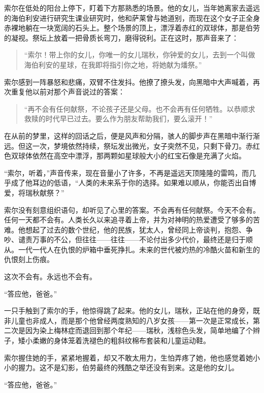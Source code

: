 \documentclass[AutoFakeBold=true]{book}
\begin{document}
索尔在低处的阳台上停下，盯着下方那熟悉的场景。他的女儿，当年她离家去遥远的海伯利安进行研究生课业研究时，他和萨莱曾与她道别，而现在这个女子正全身赤裸地躺在一块宽阔的石头上。整个场景的顶上，漂浮着赤红的双球体，那是伯劳的凝视。祭坛上放着一把骨质长弯刀，磨得锐利。正在这时，那声音来了：

\begin{quotation}
	{\kaishu ``索尔！带上你的女儿，你唯一的女儿瑞秋，你钟爱的女儿，去到一个叫做海伯利安的星球，在我即将指引你之地，将她献为燔祭。''}
\end{quotation}

索尔感到一阵暴怒和悲痛，双臂不住发抖。他撩了撩头发，向黑暗中大声喊着，再次重复他以前对那个声音说过的答案：

\begin{quotation}
	{\kaishu ``再不会有任何献祭，不论孩子还是父母。也不会再有任何牺牲。以恭顺求救赎的时代早已过去。要么作为朋友帮助我们，要么滚开！''}
\end{quotation}

在从前的梦里，这样的回话之后，便是风声和分隔，骇人的脚步声在黑暗中渐行渐远。但这一次，梦境依然持续，祭坛发出微光，女子突然不见，只剩下骨刀。赤红色双球体依然在高空中漂浮，那两颗如星球般大小的红宝石像是充满了火焰。

{\kaishu ``索尔，听着，''}声音传来，现在音量小了许多，不再是遥远天顶隆隆的雷鸣，而几乎成了他耳边的低语，{\kaishu ``人类的未来系于你的选择。如果难以顺从，你能否出自博爱，将瑞秋献祭？''}

索尔没有刻意组织语句，却听见了心里的答案。不会再有任何献祭。今天不会有。任何一天都不会有。人类长久以来追寻着上帝，并为对神明的热爱遭受了够多的苦难。他想起了过去的数个世纪，他的民族，犹太人，曾经同上帝谈判，抱怨、争吵、谴责万事的不公，但往往——往往——不论付出多少代价，最终还是归于顺从。一代一代人在仇恨的炉箱中垂死挣扎。未来的世代被灼热的冷酷火苗和新生的仇恨刻上伤痕。

这次不会有。永远也不会有。

``答应他，爸爸。''

一只手触到了索尔的手，他惊得跳了起来。他的女儿，瑞秋，正站在他的身旁，既非儿童也非成人，而是那个他曾经两度熟知的八岁女孩——第一次是正常成长，第二次是因为染上梅林症而退回到那个年纪——瑞秋，浅棕色头发，简单地编了个辫子，矮小柔嫩的身体笼着洗褪色的粗斜纹棉布套装和儿童运动鞋。

索尔握住她的手，紧紧地握着，却又不敢太用力，生怕弄疼了她，他也感觉着她小小的握力。这不是幻影，伯劳最终的残酷之举还没有到来。这是他的女儿。

``答应他，爸爸。''
\end{document}
